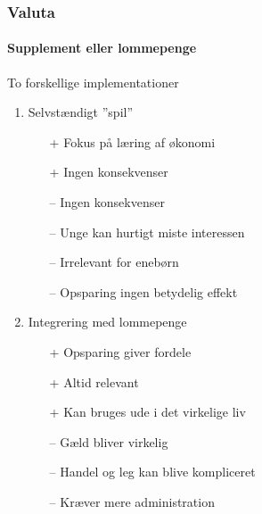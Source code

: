 
\newcommand{\bad}{{\color{red}--}}
\newcommand{\good}{{\color{ForestGreen}+}}

\begin{frame}
\frametitle{Valuta}
\framesubtitle{Supplement eller lommepenge} %
    To forskellige implementationer
    \begin{multicols}{2}
        \begin{enumerate}
            \item{Selvstændigt ''spil''}
            \begin{itemize}
                \item[\good]{Fokus på læring af økonomi}
                \item[\good]{Ingen konsekvenser}
                \item[\bad]{Ingen konsekvenser}
                \item[\bad]{Unge kan hurtigt miste interessen}
                \item[\bad]{Irrelevant for enebørn}
                \item[\bad]{Opsparing ingen betydelig effekt}
            \end{itemize}
            \columnbreak 
            \item{Integrering med lommepenge}
            \begin{itemize}
                \item[\good]{Opsparing giver fordele}
                \item[\good]{Altid relevant}
                \item[\good]{Kan bruges ude i det virkelige liv}
                \item[\bad]{Gæld bliver virkelig}
                \item[\bad]{Handel og leg kan blive kompliceret}
                \item[\bad]{Kræver mere administration}
            \end{itemize}
        \end{enumerate}
    \end{multicols}
\end{frame}
    
